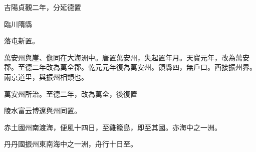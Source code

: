 \begin{pinyinscope}
 吉陽貞觀二年，分延德置



 臨川隋縣



 落屯新置。



 萬安州與崖、儋同在大海洲中。唐置萬安州，失起置年月。天寶元年，改為萬安郡。至德二年改為萬全郡。乾元元年復為萬安州。領縣四，無戶口。西接振州界。兩京道里，與振州相類也。



 萬安州所治。至德二年，改為萬全，後復置



 陵水富云博遼與州同置。



 赤土國州南渡海，便風十四日，至雞籠島，即至其國。亦海中之一洲。



 丹丹國振州東南海中之一洲，舟行十日至。



\end{pinyinscope}